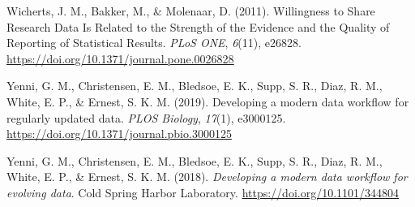 \begin{CSLReferences}{1}{0}
\leavevmode{}%
Wicherts, J. M., Bakker, M., \& Molenaar, D. (2011). Willingness to Share Research Data Is Related to the Strength of the Evidence and the Quality of Reporting of Statistical Results. \emph{PLoS ONE}, \emph{6}(11), e26828. \url{https://doi.org/10.1371/journal.pone.0026828}

\leavevmode{}%
Yenni, G. M., Christensen, E. M., Bledsoe, E. K., Supp, S. R., Diaz, R. M., White, E. P., \& Ernest, S. K. M. (2019). Developing a modern data workflow for regularly updated data. \emph{PLOS Biology}, \emph{17}(1), e3000125. \url{https://doi.org/10.1371/journal.pbio.3000125}

\leavevmode{}%
Yenni, G. M., Christensen, E. M., Bledsoe, E. K., Supp, S. R., Diaz, R. M., White, E. P., \& Ernest, S. K. M. (2018). \emph{Developing a modern data workflow for evolving data}. Cold Spring Harbor Laboratory. \url{https://doi.org/10.1101/344804}

\end{CSLReferences}
